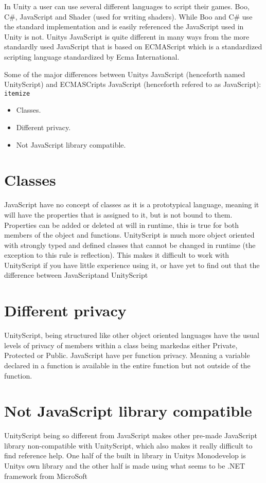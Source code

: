 In Unity a user can use several different languages to script their games. Boo, C\#, JavaScript and Shader (used for writing shaders).
While Boo and C\#  use the standard implementation and is easily referenced the JavaScript used in Unity is not.\cite{WikiScriptVSScript}
Unitys JavaScript is quite different in many ways from the more standardly used JavaScript that is based on ECMAScript\cite{ECMAscipt} which is a standardized scripting
language standardized by Ecma International.

Some of the major differences between Unitys JavaScript (henceforth named UnityScript) and ECMASCripts JavaScript (henceforth refered to as JavaScript):
\texttt{itemize}
\begin{itemize}
	\item Classes.
	\item Different privacy.
	\item Not JavaScript library compatible.
\end{itemize}

\section {Classes}
JavaScript have no concept of classes as it is a prototypical language, meaning it will have the properties that is assigned to it, but is not bound to them.
Properties can be added or deleted at will in runtime, this is true for both members of the object and functions. UnityScript is much more object oriented with strongly typed and defined classes that cannot be changed in runtime (the exception to this rule is reflection).
This makes it difficult to work with UnityScript if you have little experience using it, or have yet to find out that the difference between JavaScriptand UnityScript



\section {Different privacy}
UnityScript, being structured like other object oriented languages have the usual levels of privacy of members within a class being markedas either Private, Protected or Public. JavaScript have per function privacy. Meaning a variable declared in a function is available in the entire function but not
outside of the function.

\section {Not JavaScript library compatible}
UnityScript being so different from JavaScript makes other pre-made JavaScript library non-compatible with UnityScript, which also makes it really difficult to find reference help. One half of the built in library in Unitys Monodevelop is Unitys own library and the other half is made using what seems to be .NET framework from MicroSoft

